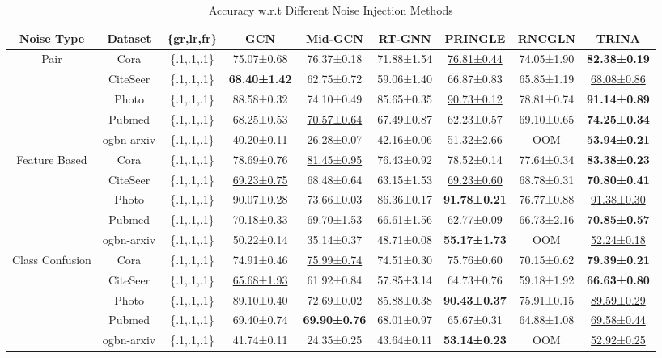 \documentclass[sigconf, anonymous, review]{acmart}
\begin{document}
      \begin{table}
        \centering
        \caption{Accuracy w.r.t Different Noise Injection Methods}
        {\small
        \begin{tabular}{ccccccccc}
          \toprule
          Noise Type &Dataset&\{gr,lr,fr\} & GCN & Mid-GCN & RT-GNN & PRINGLE & RNCGLN & TRINA\\
          \midrule
          \multirow{5}{*}{Pair} & Cora &\{.1,.1,.1\}&75.07±0.68&76.37±0.18&71.88±1.54&\underline{76.81±0.44}&74.05±1.90&\textbf{82.38±0.19} \\
          & CiteSeer &\{.1,.1,.1\}&\textbf{68.40±1.42}&62.75±0.72&59.06±1.40&66.87±0.83&65.85±1.19&\underline{68.08±0.86}\\
          & Photo &\{.1,.1,.1\}&88.58±0.32&74.10±0.49&85.65±0.35&\underline{90.73±0.12}&78.81±0.74&\textbf{91.14±0.89} \\
          & Pubmed &\{.1,.1,.1\}&68.25±0.53&\underline{70.57±0.64}&67.49±0.87&62.23±0.57&69.10±0.65&\textbf{74.25±0.34} \\
          & ogbn-arxiv &\{.1,.1,.1\}&40.20±0.11&26.28±0.07&42.16±0.06&\underline{51.32±2.66}&OOM&\textbf{53.94±0.21}\\
          \midrule
          \multirow{5}{*}{Feature Based} & Cora &\{.1,.1,.1\}&78.69±0.76&\underline{81.45±0.95}&76.43±0.92&78.52±0.14&77.64±0.34&\textbf{83.38±0.23}  \\
          & CiteSeer &\{.1,.1,.1\}&\underline{69.23±0.75}&68.48±0.64&63.15±1.53&\underline{69.23±0.60}&68.78±0.31&\textbf{70.80±0.41}\\
          & Photo &\{.1,.1,.1\}&90.07±0.28&73.66±0.03&86.36±0.17&\textbf{91.78±0.21}&76.77±0.88&\underline{91.38±0.30}  \\          
          & Pubmed &\{.1,.1,.1\}&\underline{70.18±0.33}&69.70±1.53&66.61±1.56&62.77±0.09&66.73±2.16&\textbf{70.85±0.57}\\
          & ogbn-arxiv &\{.1,.1,.1\}&50.22±0.14&35.14±0.37&48.71±0.08&\textbf{55.17±1.73}&OOM&\underline{52.24±0.18}\\
          \midrule
          \multirow{5}{*}{Class Confusion} & Cora &\{.1,.1,.1\}&74.91±0.46&\underline{75.99±0.74}&74.51±0.30&75.76±0.60&70.15±0.62&\textbf{79.39±0.21}  \\ 
          & CiteSeer &\{.1,.1,.1\}&\underline{65.68±1.93}&61.92±0.84&57.85±3.14&64.73±0.76&59.18±1.92&\textbf{66.63±0.80}\\
          &Photo &\{.1,.1,.1\}&89.10±0.40&72.69±0.02&85.88±0.38&\textbf{90.43±0.37}&75.91±0.15&\underline{89.59±0.29} \\
          & Pubmed &\{.1,.1,.1\}&69.40±0.74&\textbf{69.90±0.76}&68.01±0.97&65.67±0.31&64.88±1.08&\underline{69.58±0.44}\\
          & ogbn-arxiv &\{.1,.1,.1\}&41.74±0.11&24.35±0.25&43.64±0.11&\textbf{53.14±0.23}&OOM&\underline{52.92±0.25}\\
          \bottomrule
        \end{tabular}}
        \label{tab:performence_dtn}
      \end{table}
\end{document}
